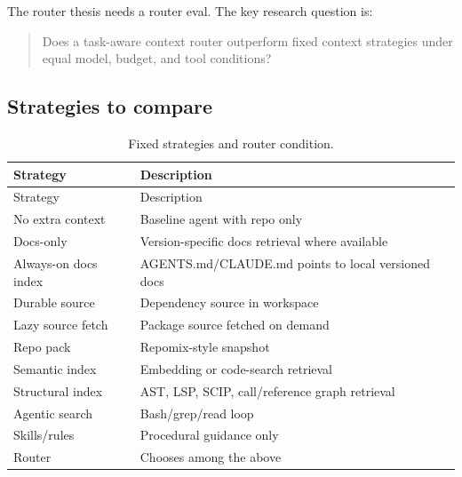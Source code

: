 \documentclass[
  11pt,
  letterpaper,
  numbers=noendperiod,
  parskip=half]{scrartcl}
\begin{document}
The router thesis needs a router eval. The key research question is:

\begin{quote}
Does a task-aware context router outperform fixed context strategies
under equal model, budget, and tool conditions?
\end{quote}

\subsection{Strategies to compare}\label{sec-eval-strategies}

\begin{longtable}[]{@{}
  >{\raggedright\arraybackslash}p{}
  >{\raggedright\arraybackslash}p{}@{}}
\caption{Fixed strategies and router
condition.}\label{tbl-eval-strategies}\tabularnewline
\toprule\noalign{}
\begin{minipage}[b]{\linewidth}\raggedright
Strategy
\end{minipage} & \begin{minipage}[b]{\linewidth}\raggedright
Description
\end{minipage} \\
\midrule\noalign{}
\endfirsthead
\toprule\noalign{}
\begin{minipage}[b]{\linewidth}\raggedright
Strategy
\end{minipage} & \begin{minipage}[b]{\linewidth}\raggedright
Description
\end{minipage} \\
\midrule\noalign{}
\endhead
\bottomrule\noalign{}
\endlastfoot
No extra context & Baseline agent with repo only \\
Docs-only & Version-specific docs retrieval where available \\
Always-on docs index & AGENTS.md/CLAUDE.md points to local versioned
docs \\
Durable source & Dependency source in workspace \\
Lazy source fetch & Package source fetched on demand \\
Repo pack & Repomix-style snapshot \\
Semantic index & Embedding or code-search retrieval \\
Structural index & AST, LSP, SCIP, call/reference graph retrieval \\
Agentic search & Bash/grep/read loop \\
Skills/rules & Procedural guidance only \\
Router & Chooses among the above \\
\end{longtable}
\end{document}
